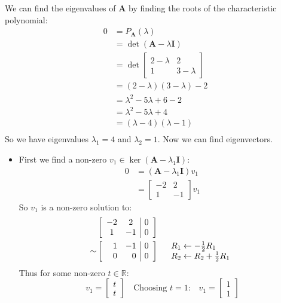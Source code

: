 \documentclass[a4paper, 11pt]{article}
\newcommand{\RR}{\mathbb{R}}
\begin{document}
\begin{enumerate}[label=(\alph*)]
  We can find the eigenvalues of $\mathbf{A}$ by finding the roots of the characteristic polynomial: 
  \begin{align*}
    0&=P_\mathbf{A}(\lambda)\\
    &=\det(\mathbf{A}-\lambda \mathbf{I})\\
    &=\det\begin{bmatrix}
      2-\lambda & 2\\
      1 & 3-\lambda
    \end{bmatrix}\\
    &=(2-\lambda)(3-\lambda)-2\\
    &=\lambda^2-5\lambda+6-2\\
    &=\lambda^2-5\lambda+4\\
    &=(\lambda-4)(\lambda-1)\\
  \end{align*}
  So we have eigenvalues $\lambda_1=4$ and $\lambda_2=1$. Now we can find eigenvectors.
  \begin{itemize}
    \item First we find a non-zero $v_1\in\ker(\mathbf{A}-\lambda_1 \mathbf{I})$: 
    \begin{align*}
      0 &= (\mathbf{A}-\lambda_1 \mathbf{I})v_1\\
      &=\begin{bmatrix}
            -2 &  2 \\ 
             1 & -1
          \end{bmatrix}v_1
    \end{align*}
    So $v_1$ is a non-zero solution to: 
    \begin{align*}
      &\left[ 
        \begin{array}{cc|c}
          -2 & 2 & 0 \\
          1 & -1 & 0 \\
        \end{array}
       \right]\\
       \sim&\left[ 
        \begin{array}{rr|r}
          \hphantom{-}1 & -1 & 0 \\
          0 & 0 & 0 \\
        \end{array}
       \right]\quad\begin{array}{l}
        R_1\leftarrow -\frac 12 R_1\\
        R_2\leftarrow R_2 + \frac 12 R_1
       \end{array}
    \end{align*}
    Thus for some non-zero $t\in\RR$:
    \[
     v_1=\begin{bmatrix}
       t \\
       t 
     \end{bmatrix}  \quad\text{Choosing $t=1$:}\quad v_1=\begin{bmatrix}
      1\\
      1
     \end{bmatrix}
    \]
  

\end{itemize}
\end{enumerate}
\end{document}
